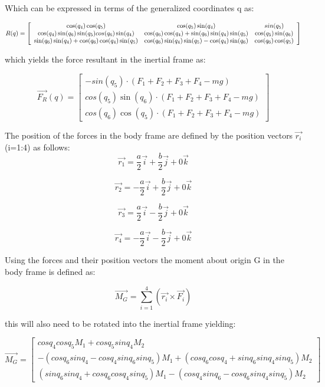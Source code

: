\documentclass[12pt, letterpaper]{article}
\begin{document}
Which can be expressed in terms of the generalized coordinates q as:

\[
R(q)=\left[\begin{array}{ccc}
\cos(q_{4})\cos(q_{5}) & \cos(q_{5})\sin(q_{4}) & \-sin(q_{5})\\
\cos(q_{4})\sin(q_{6})\sin(q_{5})\-cos(q_{6})\sin(q_{4}) & \cos(q_{6})\cos(q_{4})+\sin(q_{6})\sin(q_{4})\sin(q_{5}) & \cos(q_{5})\sin(q_{6})\\
\sin(q_{6})\sin(q_{4})+\cos(q_{6})\cos(q_{4})\sin(q_{5}) & \cos(q_{6})\sin(q_{4})\sin(q_{5})-\cos(q_{4})\sin(q_{6}) & \cos(q_{6})\cos(q_{5})
\end{array}\right]
\]

which yields the force resultant in the inertial frame as:

\[
\overrightarrow{F_{R}}(q)=\left[\begin{array}{c}
-sin(q_{5})\cdot(F_{1}+F_{2}+F_{3}+F_{4}-mg)\\
cos(q_{5})\sin(q_{6})\cdot(F_{1}+F_{2}+F_{3}+F_{4}-mg)\\
cos(q_{6})\cos(q_{5})\cdot(F_{1}+F_{2}+F_{3}+F_{4}-mg)
\end{array}\right]
\]

The position of the forces in the body frame are defined by the position
vectors $\overrightarrow{r_{i}}$ (i=1:4) as follows:
\[
\overrightarrow{r_{1}}=\frac{a}{2}\overrightarrow{i}+\frac{b}{2}\overrightarrow{j}+0\overrightarrow{k}
\]

\[
\overrightarrow{r_{2}}=-\frac{a}{2}\overrightarrow{i}+\frac{b}{2}\overrightarrow{j}+0\overrightarrow{k}
\]

\[
\overrightarrow{r_{3}}=\frac{a}{2}\overrightarrow{i}-\frac{b}{2}\overrightarrow{j}+0\overrightarrow{k}
\]

\[
\overrightarrow{r_{4}}=-\frac{a}{2}\overrightarrow{i}-\frac{b}{2}\overrightarrow{j}+0\overrightarrow{k}
\]

Using the forces and their position vectors the moment about origin
G in the body frame is defined as:

\[
\overrightarrow{M_{G}}=\sum_{i=1}^{4}(\overrightarrow{r_{i}}\times\overrightarrow{F_{i}})
\]

this will also need to be rotated into the inertial frame yielding:

\[
\overrightarrow{M_{G}}=\left[\begin{array}{c}
cosq_{4}cosq_{5}M_{1}+cosq_{5}sinq_{4}M_{2}\\
-(cosq_{6}sinq_{4}-cosq_{4}sinq_{6}sinq_{5})M_{1}+(cosq_{6}cosq_{4}+sinq_{6}sinq_{4}sinq_{5})M_{2}\\
(sinq_{6}sinq_{4}+cosq_{6}cosq_{4}sinq_{5})M_{1}-(cosq_{4}sinq_{6}-cosq_{6}sinq_{4}sinq_{5})M_{2}
\end{array}\right]
\]
\end{document}

